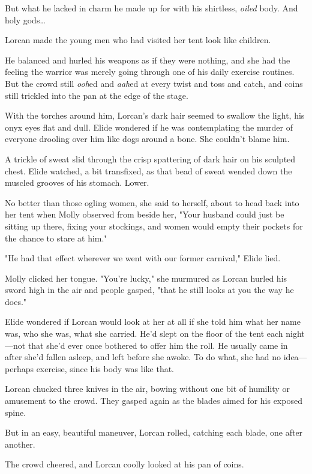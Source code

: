 But what he lacked in charm he made up for with his shirtless,
\emph{oiled} body. And holy gods\ldots{}

Lorcan made the young men who had visited her tent look like 
children.

He balanced and hurled his weapons as if they were nothing, and she had the feeling the warrior was merely going through one of his daily exercise routines. But the crowd still \emph{ooh}ed and \emph{aah}ed at every twist and toss and catch, and coins still trickled into the pan at the edge of the stage.

With the torches around him, Lorcan's dark hair seemed to swallow the light, his onyx eyes flat and dull. Elide wondered if he was contemplating the murder of everyone drooling over him like dogs around a bone. She couldn't blame him.

A trickle of sweat slid through the crisp spattering of dark hair on his sculpted chest. Elide watched, a bit transfixed, as that bead of sweat wended down the muscled grooves of his stomach. Lower.

No better than those ogling women, she said to herself, about to head back into her tent when Molly observed from beside her, "Your husband could just be sitting up there, fixing your stockings, and women would empty their pockets for the chance to stare at him."

"He had that effect wherever we went with our former carnival," Elide lied.

Molly clicked her tongue. "You're lucky," she murmured as Lorcan hurled his sword high in the air and people gasped, "that he still looks at you the way he does."

Elide wondered if Lorcan would look at her at all if she told him what her name was, who she was, what she carried. He'd slept on the floor of the tent each night---not that she'd ever once bothered to offer him the roll. He usually came in after she'd fallen asleep, and left before she awoke. To do what, she had no idea---perhaps exercise, since his body was  like that.

Lorcan chucked three knives in the air, bowing without one bit of humility or amusement to the crowd. They gasped again as the blades aimed for his exposed spine.

But in an easy, beautiful maneuver, Lorcan rolled, catching each blade, one after another.

The crowd cheered, and Lorcan coolly looked at his pan of coins.

